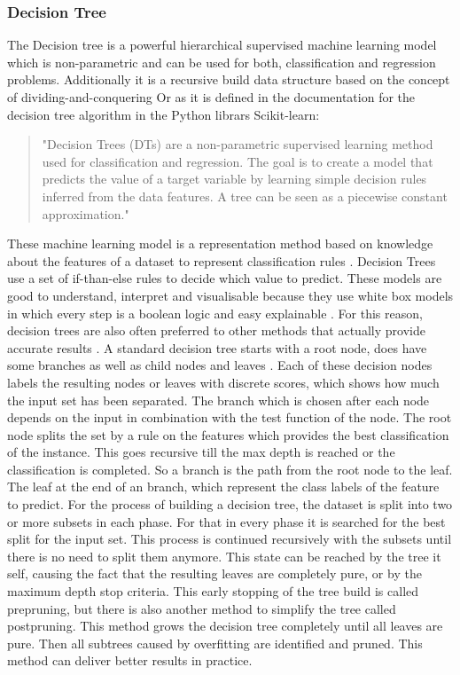 \documentclass[../masterarbeit.tex]{subfiles}
\begin{document}
\subsubsection{Decision Tree}
The Decision tree is a powerful hierarchical supervised machine learning model which is non-parametric and can be used for both, classification and regression problems. Additionally it is a recursive build data structure based on the concept of dividing-and-conquering \textcite[]{SUBASI202091}
 Or as it is defined in the documentation for the decision tree algorithm in the Python librars Scikit-learn: 
\begin{quote}
	"Decision Trees (DTs) are a non-parametric supervised learning method used for classification and regression. The goal is to create a model that predicts the value of a target variable by learning simple decision rules inferred from the data features. A tree can be seen as a piecewise constant approximation." \autocite{Scikit-learn-decision-tree:2022}
\end{quote}
These machine learning model is a representation method based on knowledge about the features of a dataset to represent classification rules \textcite[]{SUGUMARAN2007930}. 
Decision Trees use a set of if-than-else rules to decide which value to predict. These models are good to understand, interpret and visualisable because they use white box models in which every step is a boolean logic and easy explainable \textcite[]{Scikit-learn-decision-tree:2022}. For this reason, decision trees are also often preferred to other methods that actually provide accurate results \textcite[]{SUBASI202091}.
A standard decision tree starts with a root node, does have some branches as well as child nodes and leaves \textcite[]{SUGUMARAN2007930}. Each of these decision nodes labels the resulting nodes or leaves with discrete scores, which shows how much the input set has been separated. The branch which is chosen after each node depends on the input in combination with the test function of the node. \autocite[]{SUBASI202091} 
The root node splits the set by a rule on the features which provides the best classification of the instance. This goes recursive till the max depth is reached or the classification is completed. So a branch is the path from the root node to the leaf. The leaf at the end of an branch, which represent the class labels of the feature to predict. \autocite[]{SUGUMARAN2007930}
For the process of building a decision tree, the dataset is split into two or more subsets in each phase. For that in every phase it is searched for the best split for the input set. This process is continued recursively with the subsets until there is no need to split them anymore. This state can be reached by the tree it self, causing the fact that the resulting leaves are completely pure, or by the maximum depth stop criteria. This early stopping of the tree build is called prepruning, but there is also another method to simplify the tree called postpruning. This method grows the decision tree completely until all leaves are pure. Then all subtrees caused by overfitting are identified and pruned. This method can deliver better results in practice. \autocite[]{SUBASI202091}
\end{document}
